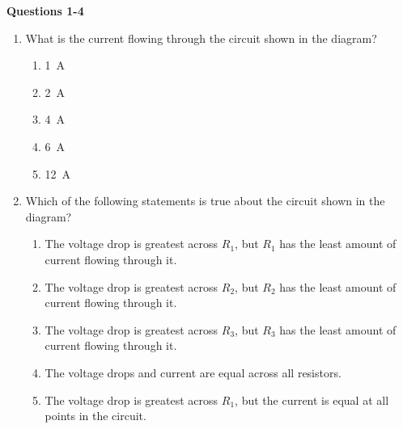 \documentclass[11pt]{article}
\begin{document}
\raggedcolumns
\begin{multicols}{2}

  \textbf{Questions 1-4}
  
  \begin{center}
  \end{center}

  \begin{enumerate}[leftmargin=18pt]

  \item What is the current flowing through the circuit shown in the diagram?
    \begin{enumerate}[noitemsep,topsep=0pt,leftmargin=18pt,label=(\Alph*)]
    \item\SI{1}{A}
    \item\SI{2}{A}
    \item\SI{4}{A}
    \item\SI{6}{A}
    \item\SI{12}{A}
    \end{enumerate}
    
  \item Which of the following statements is true about the circuit shown in the
    diagram?
    \begin{enumerate}[noitemsep,topsep=0pt,leftmargin=18pt,label=(\Alph*)]  
    \item The voltage drop is greatest across $R_1$, but $R_1$ has the least
      amount of current flowing through it.
    \item The voltage drop is greatest across $R_2$, but $R_2$ has the least
      amount of current flowing through it.
    \item The voltage drop is greatest across $R_3$, but $R_3$ has the least
      amount of current flowing through it.
    \item The voltage drops and current are equal across all resistors.
    \item The voltage drop is greatest across $R_1$, but the current is equal at
      all points in the circuit.
    \end{enumerate}

    \columnbreak
    

\end{enumerate}
\end{multicols}
\end{document}
